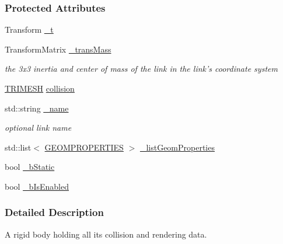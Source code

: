 \subsubsection*{Protected Attributes}
\begin{DoxyCompactItemize}
\item 
Transform \hyperlink{classOpenRAVE_1_1KinBody_1_1Link_adcfc5692c983a70c6021762566cdc7e0}{\_\-t}
\item 
\hypertarget{classOpenRAVE_1_1KinBody_1_1Link_ab634a14715f1de4a28e3eecaea8e5dbe}{
TransformMatrix \hyperlink{classOpenRAVE_1_1KinBody_1_1Link_ab634a14715f1de4a28e3eecaea8e5dbe}{\_\-transMass}}
\label{classOpenRAVE_1_1KinBody_1_1Link_ab634a14715f1de4a28e3eecaea8e5dbe}

\begin{DoxyCompactList}\small\item\em the 3x3 inertia and center of mass of the link in the link's coordinate system \item\end{DoxyCompactList}\item 
\hyperlink{classOpenRAVE_1_1KinBody_1_1Link_1_1TRIMESH}{TRIMESH} \hyperlink{classOpenRAVE_1_1KinBody_1_1Link_a6b6b4ec4cfd7d6b0ccaff370fe3ddc5e}{collision}
\item 
\hypertarget{classOpenRAVE_1_1KinBody_1_1Link_aaf2ed934b37cbbd236fdd1b01a5f5005}{
std::string \hyperlink{classOpenRAVE_1_1KinBody_1_1Link_aaf2ed934b37cbbd236fdd1b01a5f5005}{\_\-name}}
\label{classOpenRAVE_1_1KinBody_1_1Link_aaf2ed934b37cbbd236fdd1b01a5f5005}

\begin{DoxyCompactList}\small\item\em optional link name \item\end{DoxyCompactList}\item 
std::list$<$ \hyperlink{classOpenRAVE_1_1KinBody_1_1Link_1_1GEOMPROPERTIES}{GEOMPROPERTIES} $>$ \hyperlink{classOpenRAVE_1_1KinBody_1_1Link_ab6b7d1c39509f8a533583eb6b185418d}{\_\-listGeomProperties}
\item 
bool \hyperlink{classOpenRAVE_1_1KinBody_1_1Link_ae7605f811744b718329556c2399ee430}{\_\-bStatic}
\item 
bool \hyperlink{classOpenRAVE_1_1KinBody_1_1Link_af3bf3d9314227021700269eb8eff8359}{\_\-bIsEnabled}
\end{DoxyCompactItemize}


\subsubsection{Detailed Description}
A rigid body holding all its collision and rendering data. 

